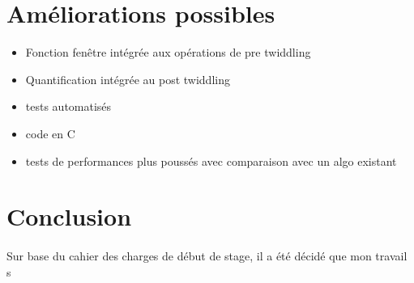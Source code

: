 \documentclass{article}
\begin{document}
    \newpage
    \section{Améliorations possibles}
    \begin{itemize}
        \item Fonction fenêtre intégrée aux opérations de pre twiddling
        \item Quantification intégrée au post twiddling
        \item tests automatisés
        \item code en C
        \item tests de performances plus poussés avec comparaison avec un algo existant
    \end{itemize}



    \newpage
    \section*{Conclusion}
    \paragraph{}
    Sur base du cahier des charges de début de stage, il a été décidé que mon travail s

     
    
    
    \newpage
\end{document}
